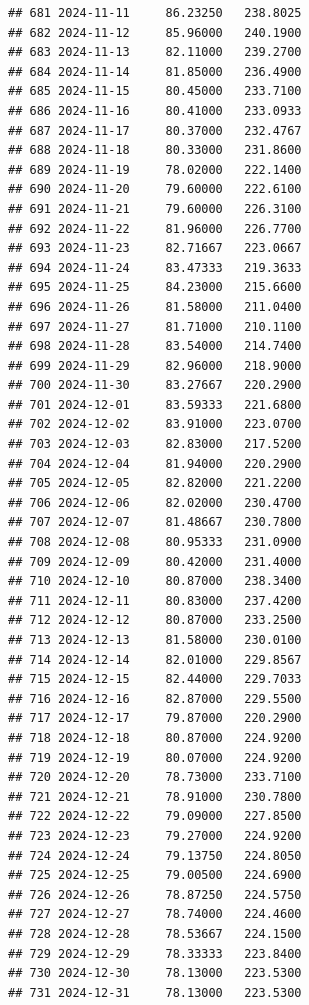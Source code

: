 \documentclass[
]{article}
\newenvironment{Shaded}{\begin{snugshade}}{\end{snugshade}}
\newcommand{\AttributeTok}[1]{\textcolor[rgb]{0.13,0.29,0.53}{#1}}
\newcommand{\FunctionTok}[1]{\textcolor[rgb]{0.13,0.29,0.53}{\textbf{#1}}}
\newcommand{\NormalTok}[1]{#1}
\newcommand{\OtherTok}[1]{\textcolor[rgb]{0.56,0.35,0.01}{#1}}
\newcommand{\SpecialCharTok}[1]{\textcolor[rgb]{0.81,0.36,0.00}{\textbf{#1}}}
\newcommand{\StringTok}[1]{\textcolor[rgb]{0.31,0.60,0.02}{#1}}
\begin{document}
\begin{verbatim}
## 681 2024-11-11     86.23250   238.8025
## 682 2024-11-12     85.96000   240.1900
## 683 2024-11-13     82.11000   239.2700
## 684 2024-11-14     81.85000   236.4900
## 685 2024-11-15     80.45000   233.7100
## 686 2024-11-16     80.41000   233.0933
## 687 2024-11-17     80.37000   232.4767
## 688 2024-11-18     80.33000   231.8600
## 689 2024-11-19     78.02000   222.1400
## 690 2024-11-20     79.60000   222.6100
## 691 2024-11-21     79.60000   226.3100
## 692 2024-11-22     81.96000   226.7700
## 693 2024-11-23     82.71667   223.0667
## 694 2024-11-24     83.47333   219.3633
## 695 2024-11-25     84.23000   215.6600
## 696 2024-11-26     81.58000   211.0400
## 697 2024-11-27     81.71000   210.1100
## 698 2024-11-28     83.54000   214.7400
## 699 2024-11-29     82.96000   218.9000
## 700 2024-11-30     83.27667   220.2900
## 701 2024-12-01     83.59333   221.6800
## 702 2024-12-02     83.91000   223.0700
## 703 2024-12-03     82.83000   217.5200
## 704 2024-12-04     81.94000   220.2900
## 705 2024-12-05     82.82000   221.2200
## 706 2024-12-06     82.02000   230.4700
## 707 2024-12-07     81.48667   230.7800
## 708 2024-12-08     80.95333   231.0900
## 709 2024-12-09     80.42000   231.4000
## 710 2024-12-10     80.87000   238.3400
## 711 2024-12-11     80.83000   237.4200
## 712 2024-12-12     80.87000   233.2500
## 713 2024-12-13     81.58000   230.0100
## 714 2024-12-14     82.01000   229.8567
## 715 2024-12-15     82.44000   229.7033
## 716 2024-12-16     82.87000   229.5500
## 717 2024-12-17     79.87000   220.2900
## 718 2024-12-18     80.87000   224.9200
## 719 2024-12-19     80.07000   224.9200
## 720 2024-12-20     78.73000   233.7100
## 721 2024-12-21     78.91000   230.7800
## 722 2024-12-22     79.09000   227.8500
## 723 2024-12-23     79.27000   224.9200
## 724 2024-12-24     79.13750   224.8050
## 725 2024-12-25     79.00500   224.6900
## 726 2024-12-26     78.87250   224.5750
## 727 2024-12-27     78.74000   224.4600
## 728 2024-12-28     78.53667   224.1500
## 729 2024-12-29     78.33333   223.8400
## 730 2024-12-30     78.13000   223.5300
## 731 2024-12-31     78.13000   223.5300
\end{verbatim}

\begin{Shaded}
\end{Shaded}
\end{document}
